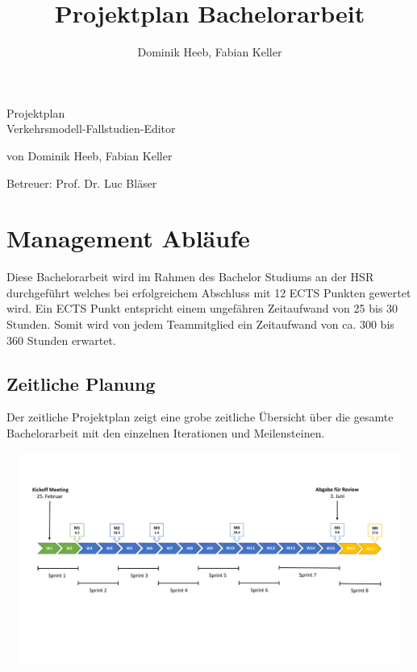\documentclass[10pt,a4paper]{article}
\author{Dominik Heeb, Fabian Keller}
\title{Projektplan Bachelorarbeit}
\begin{document}
\begin{titlepage}
	\begin{Huge}
		\begin{center}
				Projektplan \\Verkehrsmodell-Fallstudien-Editor\\[2.0cm]
		\end{center}
	\end{Huge}
	
	\begin{center}
		\begin{Large}
				von Dominik Heeb, Fabian Keller\\[1.0cm]
		\end{Large}
		\begin{large}
				Betreuer: Prof. Dr. Luc Bläser
		\end{large}
	\end{center}
\end{titlepage}

\newpage
\tableofcontents 
\newpage

\section{Management Abläufe}
\begin{flushleft}
	Diese Bachelorarbeit wird im Rahmen des Bachelor Studiums an der HSR durchgeführt welches bei erfolgreichem Abschluss mit 12 ECTS Punkten gewertet wird. Ein ECTS Punkt entspricht einem ungefähren Zeitaufwand von 25 bis 30 Stunden. Somit wird von jedem Teammitglied ein Zeitaufwand von ca. 300 bis 360 Stunden erwartet.
\end{flushleft}

\subsection{Zeitliche Planung}
	\begin{flushleft}
Der zeitliche Projektplan zeigt eine grobe zeitliche Übersicht über die gesamte Bachelorarbeit mit den einzelnen Iterationen und Meilensteinen.
	\end{flushleft}
	\includegraphics[width=17cm,height=7cm,trim=10mm 40mm 0mm 20mm, clip]{pictures/Meilensteinplan.pdf}
\end{document}
